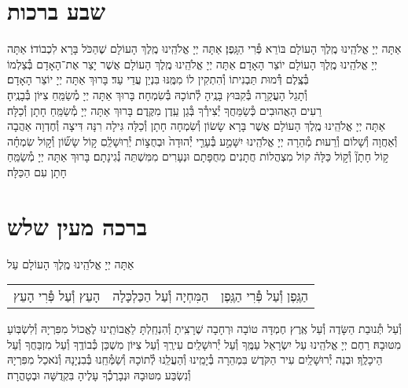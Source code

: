 \documentclass[twoside, openany, parskip=half, 11pt]{book}
\begin{document}
\section[שבע ברכות]{ שבע ברכות }

אַתָּה יְיָ אֱלֹהֵֽינוּ מֶֽלֶךְ הָעוֹלָם בּוֹרֵא פְּ֯רִי הַגָּֽפֶן׃\hfill \break
{}
אַתָּה יְיָ אֱלֹהֵֽינוּ מֶֽלֶךְ הָעוֹלָם שֶׁהַכֹּל בָּרָא לִכְבוֹדוֹ׃\hfill \break
{}
אַתָּה יְיָ אֱלֹהֵֽינוּ מֶֽלֶךְ הָעוֹלָם יוֹצֵר הָאָדָם׃\hfill \break
{}
אַתָּה יְיָ אֱלֹהֵֽינוּ מֶֽלֶךְ הָעוֹלָם אֲשֶׁר יָצַר אֶת־הָאָדָם בְּ֯צַלְמוֹ
בְּ֯צֶֽלֶם דְּ֯מוּת תַּבְנִיתוֹ וְ֯הִתְקִין לוֹ מִמֶּֽנּוּ בִּנְיַן עֲדֵי עַד׃ בָּרוּךְ אַתָּה יְיָ יוֹצֵר הָאָדָם׃\\
וְ֯תָגֵל הָעֲקָרָה בְּ֯קִבּוּץ בָּנֶֽיהָ לְ֯תוֹכָהּ בְּ֯שִׂמְחָה׃
בָּרוּךְ אַתָּה יְיָ מְ֯שַׂמֵּֽחַ צִיּוֹן בְּ֯בָנֶֽיהָ׃\\
רֵעִים הָאֲהוּבִים כְּ֯שַׂמֵּחֲךָ יְ֯צִירְ֯ךָ בְּ֯גַן עֵֽדֶן מִקֶּֽדֶם׃
בָּרוּךְ אַתָּה יְיָ מְ֯שַׂמֵּֽחַ חָתָן וְ֯כַלָּה׃\\
אַתָּה יְיָ אֱלֹהֵֽינוּ מֶֽלֶךְ הָעוֹלָם
אֲשֶׁר בָּרָא שָׂשׂוֹן וְ֯שִׂמְחָה חָתָן וְ֯כַלָּה גִּילָה רִנָּה דִּיצָה וְ֯חֶדְוָה
אַהֲבָה וְ֯אַחֲוָה וְ֯שָׁלוֹם וְ֯רֵעוּת׃
מְ֯הֵרָה יְיָ אֱלֹהֵֽינוּ יִשָּׁמַ֣ע
בְּ֯עָרֵ֤י יְ֯הוּדָה֙ וּבְחֻצ֣וֹת יְ֯רֽוּשָׁלַֽ֔םִ
ק֣וֹל שָׂשׂ֞וֹן וְ֯ק֣וֹל שִׂמְחָ֗ה ק֣וֹל חָתָן֘ וְ֯ק֣וֹל כַּלָּה֒
קוֹל מִצְהֲלוֹת חֲתָנִים מֵחֻפָּתָם וּנְעָרִים מִמִּשְׁתֵּה נְ֯גִינָתָם׃
בָּרוּךְ אַתָּה יְיָ מְ֯שַׂמֵּֽחַ חָתָן עִם הַכַּלָּה׃


\nextpage

\section[ברכה מעין שלש]{ ברכה מעין שלש }


אַתָּה יְיָ אֱלֹהֵֽינוּ מֶֽלֶךְ הָעוֹלָם עַל

\begin{tabular}{>{\centering\arraybackslash}m{} | >{\centering\arraybackslash}m{} | >{\centering\arraybackslash}m{}}

הָעֵץ וְ֯עַל פְּ֯רִי הָעֵץ
&
הַמִּחְיָה וְ֯עַל הַכַּלְכָּלָה
&
הַגֶּֽפֶן וְ֯עַל פְּ֯רִי הַגֶּֽפֶן \\

\end{tabular}

וְ֯עַל תְּ֯נוּבַת הַשָּׂדֶה וְ֯עַל אֶֽרֶץ חֶמְדָּה טוֹבָה וּרְחָבָה
שֶׁרָצִֽיתָ וְ֯הִנְחַֽלְתָּ לַאֲבוֹתֵֽינוּ לֶאֱכוֹל מִפִּרְיָהּ וְ֯לִשְׂבּֽוֹעַ מִטּוּבָהּ׃
רַחֶם יְיָ אֱלֹהֵֽינוּ עַל יִשְׂרָאֵל עַמֶּֽךָ וְ֯עַל יְ֯רוּשָׁלַֽיִם עִירֶֽךָ וְ֯עַל צִיּוֹן מִשְׁכַּן כְּ֯בוֹדֶֽךָ וְ֯עַל מִזְבַּחֲךָ וְ֯עַל הֵיכָלֶֽךָ׃ וּבְנֵה יְ֯רוּשָׁלַֽיִם עִיר הַקֹּדֶשׁ בִּמְהֵרָה בְּ֯יָמֵֽינוּ וְ֯הַעֲלֵֽנוּ לְ֯תוֹכָהּ וְ֯שַׂמְּ֯חֵֽנוּ בְּ֯בִנְיָנָהּ וְ֯נֹאכַל מִפִּרְיָהּ וְ֯נִשְׂבַּע מִטּוּבָהּ וּנְבָרֶכְ֯ךָ עָלֶיהָ בִּקְדֻשָּׁה וּבְטָהֳרָה׃
\end{document}
